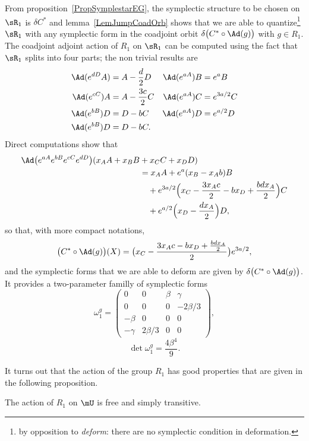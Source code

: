 From proposition~\ref{PropSymplestarEG}, the symplectic structure to be chosen on $\sR_1$ is $\delta C^*$ and lemma~\ref{LemJumpCoadOrb} shows that we are able to quantize\footnote{by opposition to \emph{deform}: there are no symplectic condition in deformation.} $\sR_1$ with any symplectic form in the coadjoint orbit $\delta\big( C^*\circ\Ad(g) \big)$ with $g\in R_1$. The coadjoint adjoint action of $R_1$ on $\sR_1$ can be computed using the fact that $\sR_1$ splits into four parts; the non trivial results are
\begin{align*}
\Ad( e^{dD}A)&=A-\frac{ d }{2}D         &\Ad( e^{aA})B&= e^{a}B\\
\Ad( e^{cC})A&=A-\frac{ 3c }{2}C        &\Ad( e^{aA})C&= e^{3a/2}C\\
\Ad( e^{bB})D&=D-bC             &\Ad( e^{aA})D&= e^{a/2}D\\
\Ad( e^{bB})D&=D-bC.
\end{align*}
Direct computations show that
\begin{equation}
\begin{split}
    \Ad\big(  e^{aA} e^{bB} e^{cC} e^{dD} \big)(x_AA+x_BB&+x_CC+x_DD)\\
            &=x_AA+ e^{a}(x_B-x_Ab)B\\
            &\quad + e^{3a/2}\Big( x_C-\frac{ 3x_Ac }{2}-bx_D +\frac{ bdx_A }{2} \Big)C\\
            &\quad+ e^{a/2}\Big( x_D-\frac{ dx_A }{2} \Big)D,
\end{split}
\end{equation}
so that, with more compact notations,
\begin{align}
\big( C^*\circ\Ad(g) \big)(X)=\big( x_C-\frac{ 3x_Ac-bx_D+\frac{ bdx_A }{2} }{2} \big) e^{3a/2},
\end{align}
and the symplectic forms that we are able to deform are given by $\delta\big( C^*\circ\Ad(g) \big)$. It provides a two-parameter familly of symplectic forms
\begin{equation}
\omega_1^g=
\begin{pmatrix}
0&0&\beta&\gamma\\
0&0&0&-2\beta/3\\
-\beta&0&0&0\\
-\gamma&2\beta/3&0&0
\end{pmatrix},
\end{equation}
\[
  \det\omega_1^g=\frac{ 4\beta^4 }{ 9 }.
\]



It turns out that the action of the group $R_1$ has good properties that are given in the following proposition.
\begin{proposition}
The action of $R_1$ on $\mU$ is free and simply transitive.
\label{PropCRunXXX}
\end{proposition}

